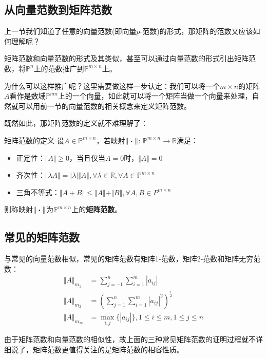 \documentclass[12pt, a4paper, oneside, UTF8]{ctexbook}
\begin{document}
\subsection{从向量范数到矩阵范数}

上一节我们知道了任意的向量范数(即向量$p$-范数)的形式，那矩阵的范数又应该如何理解呢？

矩阵范数和向量范数的形式及其类似，甚至可以通过向量范数的形式引出矩阵范数，将$\mathbb{P}^n$上的范数推广到$\mathbb{P}^{m\times n}$上。

为什么可以这样推广呢？这里需要做这样一步认定：我们可以将一个$m\times n$的矩阵$A$看作是数域$\mathbb{P}^{mn}$上的一个向量，如此就可以将一个矩阵当做一个向量来处理，自然就可以用前一节的向量范数的相关概念来定义矩阵范数。

既然如此，那矩阵范数的定义就不难理解了：
\begin{defn}{矩阵范数的定义}{}
    设$A\in\mathbb{P}^{m\times n}$，若映射$\Vert\boldsymbol{\cdot}\Vert$: $\mathbb{P}^{m\times n}\to \mathbb{R} $满足：
    \begin{itemize}
        \item 正定性：$\Vert A\Vert\geq 0$，当且仅当$A=0$时，$\Vert A\Vert=0$
        \item 齐次性：$\Vert\lambda A\Vert=|\lambda|\Vert A\Vert,\forall\lambda\in\mathbb{R},\forall A\in\mathbb{P}^{m\times n}$
        \item 三角不等式：$\Vert A+B\Vert\leq \Vert A\Vert+\Vert B\Vert,\forall A,B\in P^{m\times n}$
    \end{itemize}
    则称映射$\Vert\boldsymbol{\cdot}\Vert$为$\mathbb{P}^{m\times n}$上的\textbf{矩阵范数}。
\end{defn}

\subsection{常见的矩阵范数}

与常见的向量范数相似，常见的矩阵范数有矩阵1-范数，矩阵2-范数和矩阵无穷范数：
\[
\begin{aligned}
    \Vert A\Vert_{m_1}&=\sum_{j=-1}^{n}\sum_{i=1}^{m}|a_{ij}|\\
    \Vert A\Vert_{m_2}&=\left(\sum_{j=1}^{n}\sum_{i=1}^{m}|a_{ij}|^2\right)^{\frac{1}{2}}\\
    \Vert A\Vert_{m_{\infty}}&=\max\limits_{i,j}\{|a_{ij}|\}, 1\leq i\leq m, 1\leq j\leq n
\end{aligned}
\]

由于矩阵范数和向量范数的相似性，故上面的三种常见矩阵范数的证明过程就不详细说了，矩阵范数更值得关注的是矩阵范数的相容性质。
\end{document}
